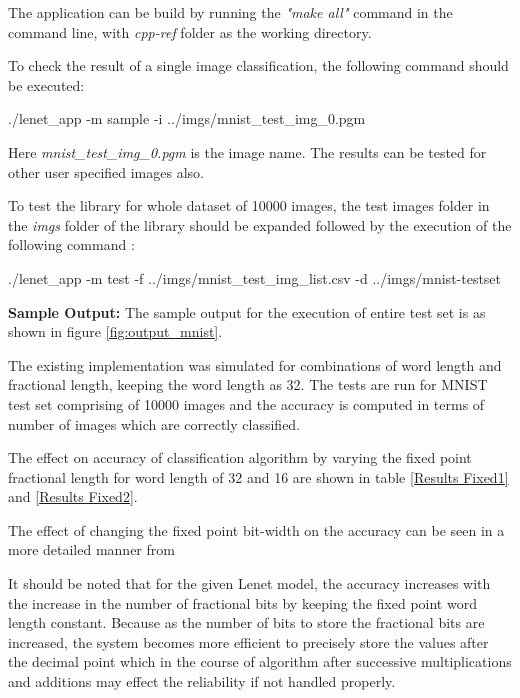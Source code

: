 
\noindent The application can be build by running the \textit{"make all"} command in the command line, with \textit{cpp-ref} folder as the working directory.

\vspace{0.25cm}
\noindent To check the result of a single image classification, the following command should be executed:

\vspace{0.25cm}
./lenet\_app -m sample -i ../imgs/mnist\_test\_img\_0.pgm

\vspace{0.25cm}
\noindent Here \textit{mnist\_test\_img\_0.pgm} is the image name. The results can be tested for other user specified images also.

\vspace{0.25cm}
\noindent To test the library for whole dataset of 10000 images, the test images folder in the \textit{imgs} folder of the library should be expanded followed by the execution of the following command :

\vspace{0.25cm}
./lenet\_app -m test -f ../imgs/mnist\_test\_img\_list.csv -d ../imgs/mnist-testset

\vspace{0.25cm}
\noindent \textbf{Sample Output:} The sample output for the execution of entire test set is as shown in figure \ref{fig:output_mnist}.


\noindent The existing implementation was simulated for combinations of word length and fractional length, keeping the word length as 32. The tests are run for MNIST test set comprising of 10000 images and the accuracy is computed in terms of number of images which are correctly classified.

\noindent The effect on accuracy of classification algorithm by varying the fixed point fractional length for word length of 32 and 16 are shown in table \ref{Results Fixed1} and \ref{Results Fixed2}.




\noindent The effect of changing the fixed point bit-width on the accuracy can be seen in a more detailed manner from 

\vspace{0.25cm}
\noindent It should be noted that for the given Lenet model, the accuracy increases with the increase in the number of fractional bits by keeping the fixed point word length constant. Because as the number of bits to store the fractional bits are increased, the system becomes more efficient to precisely store the values after the decimal point which in the course of algorithm after successive multiplications and additions may effect the reliability if not handled properly.

